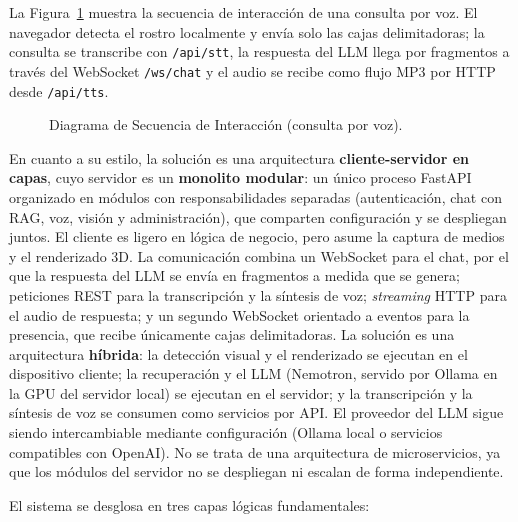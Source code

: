 La Figura~\ref{fig:diag_secuencia} muestra la secuencia de interacción de una consulta por voz. El navegador detecta el rostro localmente y envía solo las cajas delimitadoras; la consulta se transcribe con \texttt{/api/stt}, la respuesta del LLM llega por fragmentos a través del WebSocket \texttt{/ws/chat} y el audio se recibe como flujo MP3 por HTTP desde \texttt{/api/tts}.

\begin{landscape}
\begin{figure}[p]
  \centering
  \resizebox{!}{0.8\textheight}{}
  \caption{Diagrama de Secuencia de Interacción (consulta por voz).}
  \label{fig:diag_secuencia}
  \elaboradopor{\autorTFG}
\end{figure}
\end{landscape}

En cuanto a su estilo, la solución es una arquitectura \textbf{cliente-servidor en capas}, cuyo servidor es un \textbf{monolito modular}: un único proceso FastAPI organizado en módulos con responsabilidades separadas (autenticación, chat con RAG, voz, visión y administración), que comparten configuración y se despliegan juntos. El cliente es ligero en lógica de negocio, pero asume la captura de medios y el renderizado 3D. La comunicación combina un WebSocket para el chat, por el que la respuesta del LLM se envía en fragmentos a medida que se genera; peticiones REST para la transcripción y la síntesis de voz; \textit{streaming} HTTP para el audio de respuesta; y un segundo WebSocket orientado a eventos para la presencia, que recibe únicamente cajas delimitadoras. La solución es una arquitectura \textbf{híbrida}: la detección visual y el renderizado se ejecutan en el dispositivo cliente; la recuperación y el LLM (Nemotron, servido por Ollama en la GPU del servidor local) se ejecutan en el servidor; y la transcripción y la síntesis de voz se consumen como servicios por API. El proveedor del LLM sigue siendo intercambiable mediante configuración (Ollama local o servicios compatibles con OpenAI). No se trata de una arquitectura de microservicios, ya que los módulos del servidor no se despliegan ni escalan de forma independiente.

El sistema se desglosa en tres capas lógicas fundamentales:

